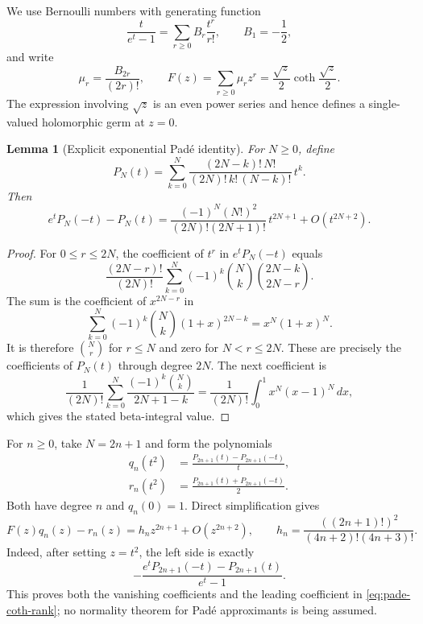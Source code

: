 \documentclass[11pt,a4paper]{article}
\numberwithin{equation}{section}
\theoremstyle{plain}
\newtheorem{lemma}[theorem]{Lemma}
\theoremstyle{definition}
\theoremstyle{remark}
\begin{document}
We use Bernoulli numbers with generating function
\[
 \frac{t}{e^t-1}=\sum_{r\geq0}B_r\frac{t^r}{r!},
 \qquad B_1=-\frac12,
\]
and write
\[
 \mu_r=\frac{B_{2r}}{(2r)!},\qquad
 F(z)=\sum_{r\geq0}\mu_rz^r
     =\frac{\sqrt z}{2}\coth\frac{\sqrt z}{2}.
\]
The expression involving $\sqrt z$ is an even power series and hence
defines a single-valued holomorphic germ at $z=0$.

\begin{lemma}[Explicit exponential Pad\'e identity]
\label{lem:exp-pade-rank}
For $N\geq0$, define
\[
 P_N(t)=\sum_{k=0}^N
   \frac{(2N-k)!\,N!}{(2N)!\,k!\,(N-k)!}\,t^k.
\]
Then
\begin{equation}\label{eq:exp-pade-rank}
 e^tP_N(-t)-P_N(t)
 =\frac{(-1)^N(N!)^2}{(2N)!(2N+1)!}\,t^{2N+1}
  +O(t^{2N+2}).
\end{equation}
\end{lemma}

\begin{proof}
For $0\leq r\leq2N$, the coefficient of $t^r$ in
$e^tP_N(-t)$ equals
\[
 \frac{(2N-r)!}{(2N)!}
 \sum_{k=0}^N(-1)^k\binom Nk
                 \binom{2N-k}{2N-r}.
\]
The sum is the coefficient of $x^{2N-r}$ in
\[
 \sum_{k=0}^N(-1)^k\binom Nk(1+x)^{2N-k}
 =x^N(1+x)^N.
\]
It is therefore $\binom Nr$ for $r\leq N$ and zero for $N<r\leq2N$.
These are precisely the coefficients of $P_N(t)$ through degree
$2N$.  The next coefficient is
\[
 \frac1{(2N)!}\sum_{k=0}^N
       \frac{(-1)^k\binom Nk}{2N+1-k}
 =\frac1{(2N)!}\int_0^1x^N(x-1)^N\,dx,
\]
which gives the stated beta-integral value.
\end{proof}

For $n\geq0$, take $N=2n+1$ and form the polynomials
\begin{align}
 q_n(t^2)&=\frac{P_{2n+1}(t)-P_{2n+1}(-t)}t,
 \\
 r_n(t^2)&=\frac{P_{2n+1}(t)+P_{2n+1}(-t)}2.
\end{align}
Both have degree $n$ and $q_n(0)=1$.  Direct simplification gives
\begin{equation}\label{eq:pade-coth-rank}
 F(z)q_n(z)-r_n(z)
 =h_nz^{2n+1}+O(z^{2n+2}),
 \qquad
 h_n=\frac{((2n+1)!)^2}{(4n+2)!(4n+3)!}.
\end{equation}
Indeed, after setting $z=t^2$, the left side is exactly
\[
 -\frac{e^tP_{2n+1}(-t)-P_{2n+1}(t)}{e^t-1}.
\]
This proves both the vanishing coefficients and the leading
coefficient in \eqref{eq:pade-coth-rank}; no normality theorem for
Pad\'e approximants is being assumed.
\end{document}
